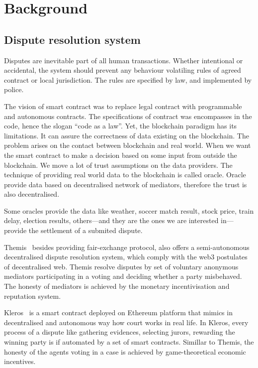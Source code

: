 \documentclass{ieeeaccess}
\begin{document}
\section{Background}
\subsection{Dispute resolution system}

Disputes are inevitable part of all human transactions. Whether intentional or accidental, the system should prevent any behaviour volatiling rules of agreed contract or local jurisdiction. The rules are specified by law, and implemented by police.

The vision of smart contract was to replace legal contract with
programmable and autonomous contracts. The specifications of contract
was encompasses in the code, hence the slogan ``code as a law''. Yet,
the blockchain paradigm has its limitations. It can assure the
correctness of data existing on the blockchain. The problem arises on
the contact between blockchain and real world. When we want the smart
contract to make a decision based on some input from outside the
blockchain. We move a lot of trust assumptions on the data providers.
The technique of providing real world data to the blockchain is called
oracle. Oracle provide data based on decentralised network of mediators,
therefore the trust is also decentralised.

Some oracles provide the data like weather, soccer match result, stock
price, train delay, election results, others---and they are the ones we
are interested in---provide the settlement of a submited dispute.


Themis~\cite{meng2019themis} besides providing fair-exchange protocol,
also offers a semi-autonomous decentralised dispute resolution system,
which comply with the web3 postulates of decentralised web. Themis
resolve disputes by set of voluntary anonymous mediators participating
in a voting and deciding whether a party misbehaved. The honesty of
mediators is achieved by the monetary incentivisation and reputation
system.

Kleros~\cite{lesaege2018kleros} is a smart contract deployed on
Ethereum platform that mimics in decentralised and autonomous way how
court works in real life. In Kleros, every process of a dispute like
gathering evidences, selecting jurors, rewarding the winning party is if
automated by a set of smart contracts. Simillar to Themis, the honesty
of the agents voting in a case is achieved by game-theoretical economic
incentives.
\end{document}
